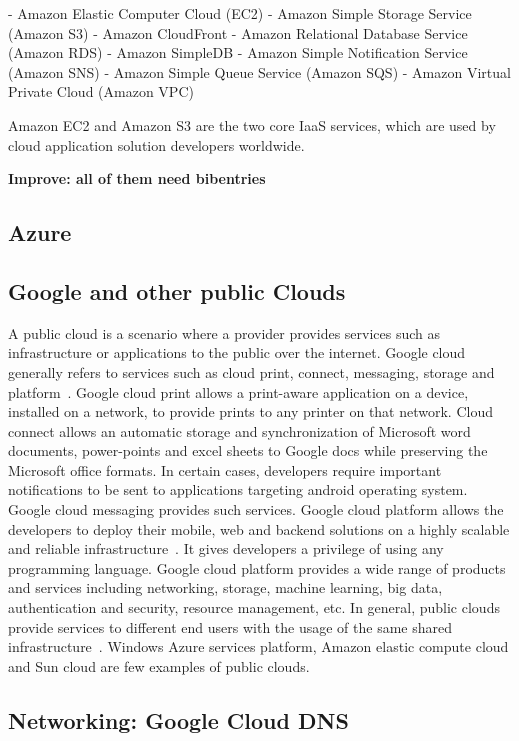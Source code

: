      -  Amazon Elastic Computer Cloud (EC2)
     -  Amazon Simple Storage Service (Amazon S3)
     -  Amazon CloudFront
     -  Amazon Relational Database Service (Amazon RDS)
     -  Amazon SimpleDB
     -  Amazon Simple Notification Service (Amazon SNS)
     -  Amazon Simple Queue Service (Amazon SQS)
     -  Amazon Virtual Private Cloud (Amazon VPC)

     Amazon EC2 and Amazon S3 are the two core IaaS services, which
     are used by cloud application solution developers
     worldwide.~\cite{www-aws}

     {\bf Improve: all of them need bibentries}
     
\subsection{Azure}
\subsection{Google and other public Clouds}

A public cloud is a scenario where a provider provides services such
as infrastructure or applications to the public over the
internet. Google cloud generally refers to services such as cloud
print, connect, messaging, storage and platform~\cite{goo1}. Google
cloud print allows a print-aware application on a device, installed on
a network, to provide prints to any printer on that network. Cloud
connect allows an automatic storage and synchronization of Microsoft
word documents, power-points and excel sheets to Google docs while
preserving the Microsoft office formats. In certain cases, developers
require important notifications to be sent to applications targeting
android operating system. Google cloud messaging provides such
services. Google cloud platform allows the developers to deploy their
mobile, web and backend solutions on a highly scalable and reliable
infrastructure~\cite{goo2}. It gives developers a privilege of using
any programming language. Google cloud platform provides a wide range
of products and services including networking, storage, machine
learning, big data, authentication and security, resource management,
etc. In general, public clouds provide services to different end users
with the usage of the same shared infrastructure~\cite{goo3}. Windows
Azure services platform, Amazon elastic compute cloud and Sun cloud
are few examples of public clouds.
     
\subsection{Networking: Google Cloud DNS}

